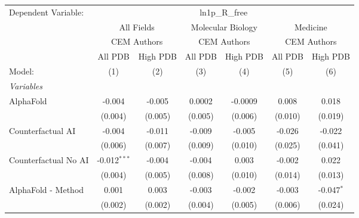 \begingroup
\centering
\begin{tabular}{lcccccc}
   \tabularnewline \midrule \midrule
   Dependent Variable: & \multicolumn{6}{c}{ln1p\_R\_free}\\
 & \multicolumn{2}{c}{All Fields} & \multicolumn{2}{c}{Molecular Biology} & \multicolumn{2}{c}{Medicine} \\
\cmidrule(lr){2-3} \cmidrule(lr){4-5} \cmidrule(lr){6-7}
 & \multicolumn{2}{c}{CEM Authors} & \multicolumn{2}{c}{CEM Authors} & \multicolumn{2}{c}{CEM Authors} \\
\cmidrule(lr){2-3} \cmidrule(lr){4-5} \cmidrule(lr){6-7}
 & \multicolumn{1}{c}{All PDB} & \multicolumn{1}{c}{High PDB} & \multicolumn{1}{c}{All PDB} & \multicolumn{1}{c}{High PDB} & \multicolumn{1}{c}{All PDB} & \multicolumn{1}{c}{High PDB} \\
\cmidrule(lr){2-2} \cmidrule(lr){3-3} \cmidrule(lr){4-4} \cmidrule(lr){5-5} \cmidrule(lr){6-6} \cmidrule(lr){7-7}
   Model:                                                     & (1)            & (2)          & (3)     & (4)     & (5)          & (6)\\  
   \midrule
   \emph{Variables}\\
   AlphaFold                                                  & -0.004         & -0.005       & 0.0002  & -0.0009 & 0.008        & 0.018\\   
                                                              & (0.004)        & (0.005)      & (0.005) & (0.006) & (0.010)      & (0.019)\\   
   Counterfactual AI                                          & -0.004         & -0.011       & -0.009  & -0.005  & -0.026       & -0.022\\   
                                                              & (0.006)        & (0.007)      & (0.009) & (0.010) & (0.025)      & (0.041)\\   
   Counterfactual No AI                                       & -0.012$^{***}$ & -0.004       & -0.004  & 0.003   & -0.002       & 0.022\\   
                                                              & (0.004)        & (0.005)      & (0.008) & (0.010) & (0.014)      & (0.013)\\   
   AlphaFold - Method                                         & 0.001          & 0.003        & -0.003  & -0.002  & -0.003       & -0.047$^{*}$\\   
                                                              & (0.002)        & (0.002)      & (0.004) & (0.005) & (0.006)      & (0.024)\\   

\end{tabular}
